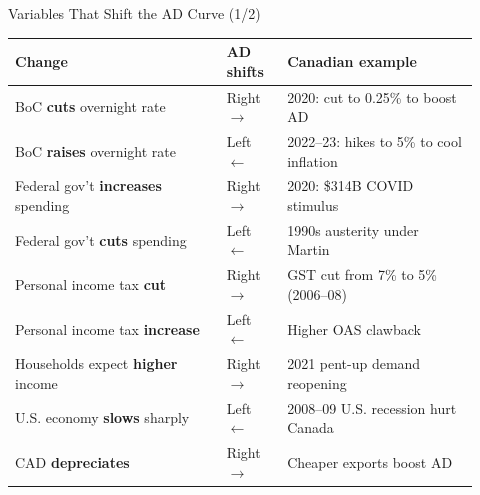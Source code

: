 \documentclass[aspectratio=169]{beamer}
\begin{document}
\begin{frame}{Variables That Shift the AD Curve (1/2)}
\transfade
\begin{center}
\begin{tabular}{p{0.42\linewidth} p{0.12\linewidth} p{0.38\linewidth}}
\toprule
\textbf{Change} & \textbf{AD shifts} & \textbf{Canadian example} \\
\midrule
BoC \textbf{cuts} overnight rate & Right $\to$ & 2020: cut to 0.25\% to boost AD \\
BoC \textbf{raises} overnight rate & Left $\leftarrow$ & 2022--23: hikes to 5\% to cool inflation \\
Federal gov't \textbf{increases} spending & Right $\to$ & 2020: \$314B COVID stimulus \\
Federal gov't \textbf{cuts} spending & Left $\leftarrow$ & 1990s austerity under Martin \\
Personal income tax \textbf{cut} & Right $\to$ & GST cut from 7\% to 5\% (2006--08) \\
Personal income tax \textbf{increase} & Left $\leftarrow$ & Higher OAS clawback \\
Households expect \textbf{higher} income & Right $\to$ & 2021 pent-up demand reopening \\
U.S. economy \textbf{slows} sharply & Left $\leftarrow$ & 2008--09 U.S. recession hurt Canada \\
CAD \textbf{depreciates} & Right $\to$ & Cheaper exports boost AD \\
\bottomrule
\end{tabular}
\end{center}
\end{frame}
\end{document}

